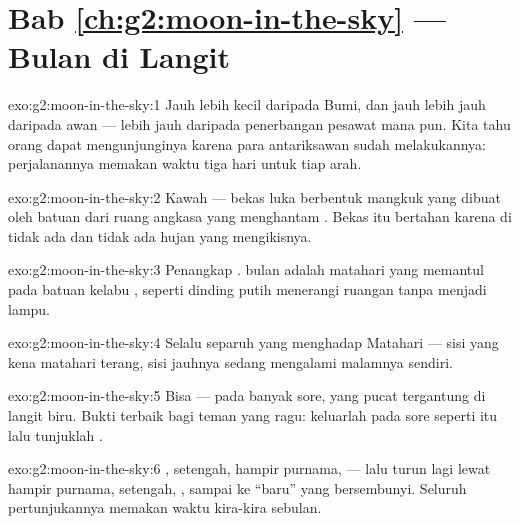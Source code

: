 \section*{Bab \ref{ch:g2:moon-in-the-sky} --- Bulan di Langit}

\begin{solution}{exo:g2:moon-in-the-sky:1}
Jauh lebih kecil daripada Bumi, dan jauh lebih jauh daripada awan ---
lebih jauh daripada penerbangan pesawat mana pun. Kita tahu orang
dapat mengunjunginya karena para antariksawan sudah melakukannya:
perjalanannya memakan waktu tiga hari untuk tiap arah.
\end{solution}

\begin{solution}{exo:g2:moon-in-the-sky:2}
Kawah --- bekas luka berbentuk mangkuk yang dibuat oleh batuan dari
ruang angkasa yang menghantam . Bekas itu bertahan karena di
 tidak ada  dan tidak ada hujan yang mengikisnya.
\end{solution}

\begin{solution}{exo:g2:moon-in-the-sky:3}
Penangkap .  bulan adalah  matahari yang memantul
pada batuan kelabu , seperti dinding putih menerangi ruangan
tanpa menjadi lampu.
\end{solution}

\begin{solution}{exo:g2:moon-in-the-sky:4}
Selalu separuh yang menghadap Matahari --- sisi yang kena matahari
terang, sisi jauhnya sedang mengalami malamnya sendiri.
\end{solution}

\begin{solution}{exo:g2:moon-in-the-sky:5}
Bisa --- pada banyak sore,  yang pucat tergantung di langit biru.
Bukti terbaik bagi teman yang ragu: keluarlah pada sore seperti itu
lalu tunjuklah .
\end{solution}

\begin{solution}{exo:g2:moon-in-the-sky:6}
, setengah, hampir purnama,  --- lalu turun lagi
lewat hampir purnama, setengah, , sampai ke  ``baru'' yang
bersembunyi. Seluruh pertunjukannya memakan waktu kira-kira sebulan.
\end{solution}

